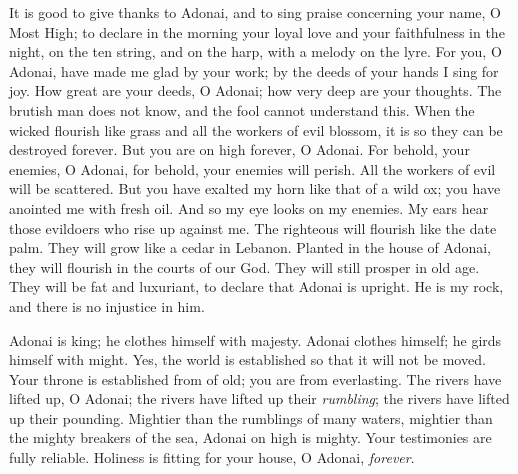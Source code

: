 \begin{biblechapter} %
 It is good to give thanks to Adonai, 
and to sing praise concerning your name, O Most High;
\verse to declare in the morning your loyal love 
and your faithfulness in the night,
\verse on the ten string, and on the harp, 
with a melody on the lyre.
\verse For you, O Adonai, have made me glad by your work; 
by the deeds of your hands I sing for joy.
\verse How great are your deeds, O Adonai; 
how very deep are your thoughts.
\verse The brutish man does not know, 
and the fool cannot understand this.
\verse When the wicked flourish like grass 
and all the workers of evil blossom, 
it is so they can be destroyed forever.
\verse But you are on high forever, O Adonai.
\verse For behold, your enemies, O Adonai, 
for behold, your enemies will perish. 
All the workers of evil will be scattered.
\verse But you have exalted my horn like that of a wild ox; 
you have anointed me with fresh oil.
\verse And so my eye looks on my enemies. 
My ears hear those evildoers who rise up against me.
\verse The righteous will flourish like the date palm. 
They will grow like a cedar in Lebanon.
\verse Planted in the house of Adonai, 
they will flourish in the courts of our God.
\verse They will still prosper in old age. 
They will be fat and luxuriant,
\verse to declare that Adonai is upright. 
He is my rock, and there is no injustice in him.
\end{biblechapter}

\begin{biblechapter} %
 Adonai is king; he clothes himself with majesty. 
Adonai clothes himself; he girds himself with might. 
Yes, the world is established so that it will not be moved.
\verse Your throne is established from of old; 
you are from everlasting.
\verse The rivers have lifted up, O Adonai; 
the rivers have lifted up their \textit{rumbling}; 
the rivers have lifted up their pounding.
\verse Mightier than the rumblings of many waters, 
mightier than the mighty breakers of the sea, 
Adonai on high is mighty.
\verse Your testimonies are fully reliable. 
Holiness is fitting for your house, 
O Adonai, \textit{forever}.
\end{biblechapter}

